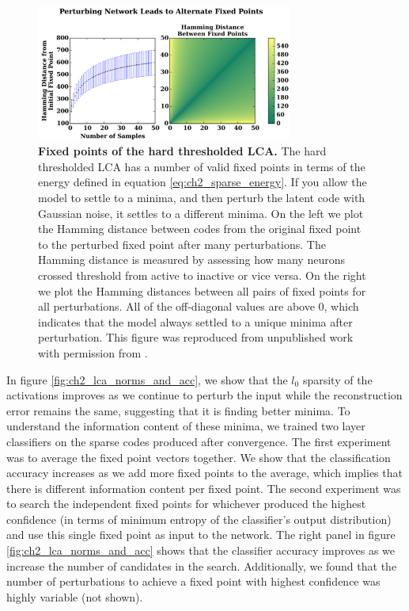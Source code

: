 \begin{figure}[h]
    \centering
    \includegraphics[width=0.75\textwidth]{figures/lca_fixed_point_distances.png}
    \caption{\textbf{Fixed points of the hard thresholded LCA.} The hard thresholded LCA has a number of valid fixed points in terms of the energy defined in equation \eqref{eq:ch2_sparse_energy}. If you allow the model to settle to a minima, and then perturb the latent code with Gaussian noise, it settles to a different minima. On the left we plot the Hamming distance between codes from the original fixed point to the perturbed fixed point after many perturbations. The Hamming distance is measured by assessing how many neurons crossed threshold from active to inactive or vice versa. On the right we plot the Hamming distances between all pairs of fixed points for all perturbations. All of the off-diagonal values are above 0, which indicates that the model always settled to a unique minima after perturbation. This figure was reproduced from unpublished work with permission from \parencite{shainin2016sampling}.}
    \label{fig:ch2_lca_fixed_point_distances}
\end{figure}

In figure \ref{fig:ch2_lca_norms_and_acc}, we show that the $l_{0}$ sparsity of the activations improves as we continue to perturb the input while the reconstruction error remains the same, suggesting that it is finding better minima. To understand the information content of these minima, we trained two layer classifiers on the sparse codes produced after convergence. The first experiment was to average the fixed point vectors together. We show that the classification accuracy increases as we add more fixed points to the average, which implies that there is different information content per fixed point. The second experiment was to search the independent fixed points for whichever produced the highest confidence (in terms of minimum entropy of the classifier's output distribution) and use this single fixed point as input to the network. The right panel in figure \ref{fig:ch2_lca_norms_and_acc} shows that the classifier accuracy improves as we increase the number of candidates in the search. Additionally, we found that the number of perturbations to achieve a fixed point with highest confidence was highly variable (not shown).

